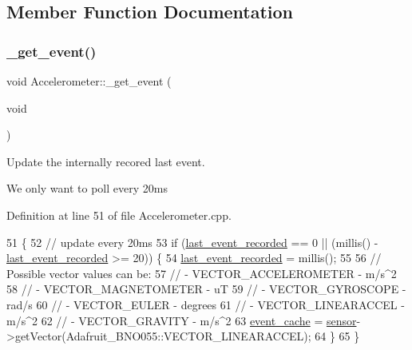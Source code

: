 \subsection{Member Function Documentation}
\mbox{\label{class_accelerometer_a0a5be85959063e5bc2092668b59b9b97}} 
\subsubsection{\texorpdfstring{\+\_\+get\+\_\+event()}{\_get\_event()}}
{\footnotesize\ttfamily void Accelerometer\+::\+\_\+get\+\_\+event (\begin{DoxyParamCaption}\item[{void}]{ }\end{DoxyParamCaption})\hspace{0.3cm}{\ttfamily [private]}}



Update the internally recored last event. 

We only want to poll every 20ms 

Definition at line 51 of file Accelerometer.\+cpp.


\begin{DoxyCode}
51                                    \{
52     \textcolor{comment}{// update every 20ms}
53     \textcolor{keywordflow}{if} (\hyperlink{class_accelerometer_a9cf8cf4caf6e866bc2b3e473155f6731}{last\_event\_recorded} == 0 || (millis() - 
      \hyperlink{class_accelerometer_a9cf8cf4caf6e866bc2b3e473155f6731}{last\_event\_recorded} >= 20)) \{
54         \hyperlink{class_accelerometer_a9cf8cf4caf6e866bc2b3e473155f6731}{last\_event\_recorded} = millis();
55 
56         \textcolor{comment}{// Possible vector values can be:}
57         \textcolor{comment}{// - VECTOR\_ACCELEROMETER - m/s^2}
58         \textcolor{comment}{// - VECTOR\_MAGNETOMETER  - uT}
59         \textcolor{comment}{// - VECTOR\_GYROSCOPE     - rad/s}
60         \textcolor{comment}{// - VECTOR\_EULER         - degrees}
61         \textcolor{comment}{// - VECTOR\_LINEARACCEL   - m/s^2}
62         \textcolor{comment}{// - VECTOR\_GRAVITY       - m/s^2}
63         \hyperlink{class_accelerometer_a179b04d61746127f9264ce87ba6e20ce}{event\_cache} = \hyperlink{class_accelerometer_a0dbf3aed48d0d0d9a16511c628ed2cba}{sensor}->getVector(Adafruit\_BNO055::VECTOR\_LINEARACCEL);
64     \}
65 \}
\end{DoxyCode}
\mbox{\label{class_accelerometer_a0570e1dd30592d3d4acc796fc4e67351}} 
